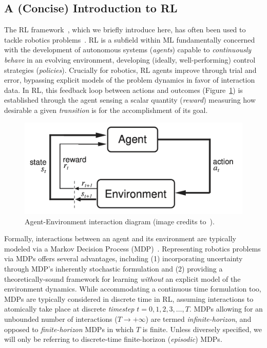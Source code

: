 \subsection{A (Concise) Introduction to RL}
The RL framework~\citep{suttonReinforcementLearningIntroduction2018}, which we briefly introduce here, has often been used to tackle robotics problems~\citep{koberReinforcementLearningRobotics}.
RL is a subfield within ML fundamentally concerned with the development of autonomous systems (\emph{agents}) capable to \emph{continuously behave} in an evolving environment, developing (ideally, well-performing) control strategies (\emph{policies}).
Crucially for robotics, RL agents improve through trial and error, bypassing explicit models of the problem dynamics in favor of interaction data.
In RL, this feedback loop between actions and outcomes (Figure~\ref{fig:rl-most-famous-pic}) is established through the agent sensing a scalar quantity (\emph{reward}) measuring how desirable a given \emph{transition} is for the accomplishment of its goal.

\begin{figure}
    \centering
    \includegraphics[width=0.5\linewidth]{figures/ch3/ch3-agent-env.png}
    \caption{Agent-Environment interaction diagram (image credits to~\citet{suttonReinforcementLearningIntroduction2018}).}
    \label{fig:rl-most-famous-pic}
\end{figure}

Formally, interactions between an agent and its environment are typically modeled via a Markov Decision Process (MDP)~\citep{bellmanMarkovianDecisionProcess1957}.
Representing robotics problems via MDPs offers several advantages, including (1) incorporating uncertainty through MDP's inherently stochastic formulation and (2) providing a theoretically-sound framework for learning \emph{without} an explicit model of the environment dynamics.
While accommodating a continuous time formulation too, MDPs are typically considered in discrete time in RL, assuming interactions to atomically take place at discrete \emph{timestep} \( t=0,1,2,3, \dots, T \).
MDPs allowing for an unbounded number of interactions (\( T \to + \infty \)) are termed \emph{infinite-horizon}, and opposed to \emph{finite-horizon} MDPs in which \( T \) is finite.
Unless diversely specified, we will only be referring to discrete-time finite-horizon (\emph{episodic}) MDPs.

